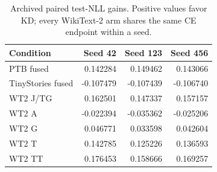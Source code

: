 \begin{table}[!t]\centering
\begin{tabular}{lrrr}
\toprule
Condition & Seed 42 & Seed 123 & Seed 456 \\
\midrule
PTB fused & 0.142284 & 0.149462 & 0.143066 \\
TinyStories fused & -0.107479 & -0.107439 & -0.106740 \\
WT2 J/TG & 0.162501 & 0.147337 & 0.157157 \\
WT2 A & -0.022394 & -0.035362 & -0.025206 \\
WT2 G & 0.046771 & 0.033598 & 0.042604 \\
WT2 T & 0.142785 & 0.125226 & 0.136593 \\
WT2 TT & 0.176453 & 0.158666 & 0.169257 \\
\bottomrule
\end{tabular}
\caption{Archived paired test-NLL gains. Positive values favor KD; every WikiText-2 arm shares the same CE endpoint within a seed.}\label{tab:per_seed_gains}
\end{table}
